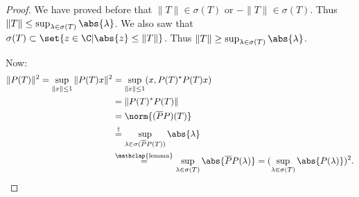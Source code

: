 \documentclass{article}
\begin{document}
\begin{proof}
    We have proved before that $\|T\| \in \sigma(T)$ or $-\|T\| \in \sigma(T)$.
    Thus $\|T\| \leq \sup_{\lambda \in \sigma(T)} \abs{\lambda}$.
    We also saw that $\sigma(T) \subset \set{z \in \C | \abs{z} \leq \|T\|}$.
    Thus $\|T\| \geq \sup_{\lambda \in \sigma(T)} \abs{\lambda}$.

    Now:
    \begin{align*}
        \|P(T)\|^2 = \sup_{\|x\| \leq 1} \|P(T) x\|^2 &= \sup_{\|x\| \leq 1} (x, P(T)^* P(T) x) \\
                                                               &= \|P(T)^* P(T)\| \\
                                                               &= \norm{(\overline{P}P) (T)} \\
                                                               &\overset{\dagger}{=} \sup_{\lambda \in \sigma(\overline{P}P(T))} \abs{\lambda} \\
                                                               &\overset{\mathclap{\text{lemma}}}{=} \sup_{\lambda \in \sigma(T)} \abs{\overline{P} P (\lambda)} = (\sup_{\lambda \in \sigma(T)} \abs{P(\lambda)})^2.
    \end{align*}
\end{proof}
\end{document}
